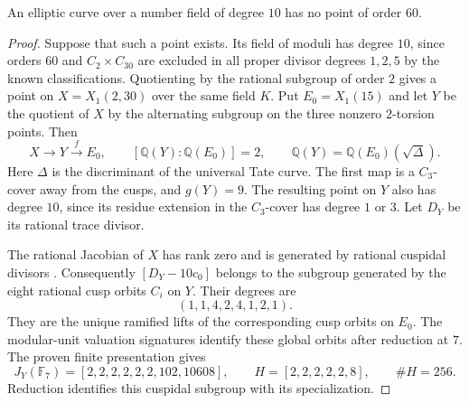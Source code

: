 
\begin{proposition}\label{prop:decic-no60}
An elliptic curve over a number field of degree $10$ has no point
of order $60$.
\end{proposition}
\begin{proof}
Suppose that such a point exists. Its field of moduli has degree
$10$, since orders $60$ and $C_2\times C_{30}$ are excluded in
all proper divisor degrees $1,2,5$ by the known classifications.
Quotienting by the rational subgroup of order $2$ gives a point
on $X=X_1(2,30)$ over the same field $K$.
Put $E_0=X_1(15)$ and let $Y$ be the quotient of $X$ by the
alternating subgroup on the three nonzero $2$-torsion points.
Then
\[
 X\longrightarrow Y\xrightarrow{f}E_0,
 \qquad [\mathbb Q(Y):\mathbb Q(E_0)]=2,
 \qquad \mathbb Q(Y)=\mathbb Q(E_0)(\sqrt{\Delta}).
\]
Here $\Delta$ is the discriminant of the universal Tate curve.
The first map is a $C_3$-cover away from the cusps, and $g(Y)=9$.
The resulting point on $Y$ also has degree $10$, since its residue
extension in the $C_3$-cover has degree $1$ or $3$.
Let $D_Y$ be its rational trace divisor.

The rational Jacobian of $X$ has rank zero and is generated by
rational cuspidal divisors
\cite[Theorem~3.1, Proposition~4.16 and Table~3]{DEHMZ}.
Consequently
$[D_Y-10c_0]$ belongs to the subgroup generated by the eight
rational cusp orbits $C_i$ on $Y$. Their degrees are
\[
 (1,1,4,2,4,1,2,1).
\]
They are the unique ramified lifts of the corresponding cusp
orbits on $E_0$. The modular-unit valuation signatures identify
these global orbits after reduction at $7$.
The proven finite presentation gives
\[
 J_Y(\mathbb F_7)=[2,2,2,2,2,2,102,10608],\qquad
 H=[2,2,2,2,2,8],\qquad \#H=256.
\]
Reduction identifies this cuspidal subgroup with its specialization.


\end{proof}
